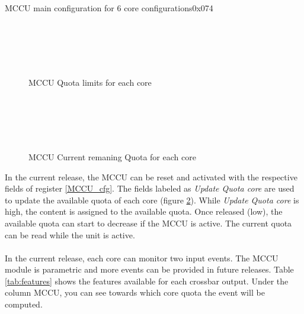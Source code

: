 \begin{register}{}{MCCU main configuration for 6 core configurations}{0x074}
	\label{MCCU_cfg_6c}
	\regnewline
\end{register}
\begin{figure}[H]
	\begin{center}
		 \\
		 \\
		 \\
		 \\
	\end{center}
	\caption{MCCU Quota limits for each core}\label{fig:MCCU_lim}
\end{figure}
\begin{figure}[H]
	\begin{center}
		 \\
		 \\
		 \\
		 \\
	\end{center}
	\caption{MCCU Current remaning Quota for each core}\label{fig:MCCU_ava}
\end{figure}
In the current release, the MCCU can be reset and activated with the respective fields of register \ref{MCCU_cfg}. The fields labeled as \textit{Update Quota core} are used to update the available quota of each core (figure \ref{fig:MCCU_ava}). While  \textit{Update Quota core} is high, the content is assigned to the available quota. Once released (low), the available quota can start to decrease if the MCCU is active. The current quota can be read while the unit is active.\\
\\
In the current release, each core can monitor two input events. The MCCU module is parametric and more events can be provided in future releases.  Table \ref{tab:features} shows the features available for each crossbar output. Under the column MCCU, you can see towards which core quota the event will be computed.
